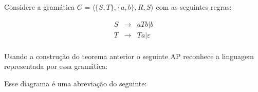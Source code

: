 \begin{example}
  Considere a gramática $G = \langle \{S,T\}, \{a,b\}, R, S \rangle$ com as seguintes regras:

  \begin{eqnarray*}
    S & \to & aTb | b \\
    T & \to & Ta | \varepsilon \\
  \end{eqnarray*}

  Usando a construção do teorema anterior o seguinte AP reconhece a linguagem representada por essa gramática:

  \begin{center}
  \end{center}

  Esse diagrama é uma abreviação do seguinte:


\end{example}
